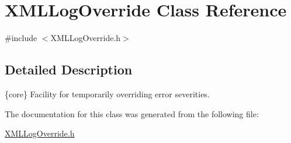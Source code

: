 \hypertarget{class_x_m_l_log_override}{}\section{X\+M\+L\+Log\+Override Class Reference}
\label{class_x_m_l_log_override}


{\ttfamily \#include $<$X\+M\+L\+Log\+Override.\+h$>$}



\subsection{Detailed Description}
\{core\} Facility for temporarily overriding error severities. 

The documentation for this class was generated from the following file\+:\begin{DoxyCompactItemize}
\item 
\hyperlink{_x_m_l_log_override_8h}{X\+M\+L\+Log\+Override.\+h}\end{DoxyCompactItemize}
